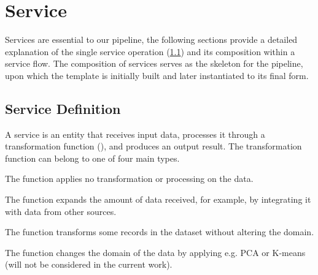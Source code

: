 \section{Service}
Services are essential to our pipeline, the following sections provide a detailed explanation of the single service operation (\cref{sec:service_definition})  and its composition within a service flow.
The composition of services serves as the skeleton for the pipeline, upon which the template is initially built and later instantiated to its final form.

\subsection{Service Definition}\label{sec:service_definition}
A service is an entity that receives input data, processes it through a transformation function (\F{}), and produces an output result.
The transformation function can belong to one of four main types.
\begin{enumerate*}[label=\roman*)]
  \item {} The function applies no transformation or processing on the data.
  \item {} The function expands the amount of data received, for example, by integrating it with data from other sources.
  \item {} The function transforms some records in the dataset without altering the domain.
  \item {}  The function changes the domain of the data by applying e.g. PCA or K-means (will not be considered in the current work).
\end{enumerate*}


